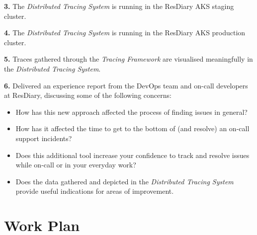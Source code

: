 \documentclass[11pt]{article}
\begin{document}
\textbf{3.} The \textit{Distributed Tracing System} is running in the ResDiary AKS staging cluster.

\textbf{4.} The \textit{Distributed Tracing System} is running in the ResDiary AKS production cluster.

\textbf{5.} Traces gathered through the \textit{Tracing Framework} are visualised meaningfully in the \textit{Distributed Tracing System}.

\textbf{6.} Delivered an experience report from the DevOps team and on-call developers at ResDiary, discussing some of the following concerns:
\begin{itemize}
    \item How has this new approach affected the process of finding issues in general?
    \item How has it affected the time to get to the bottom of (and resolve) an on-call support incidents?
    \item Does this additional tool increase your confidence to track and resolve issues while on-call or in your everyday work?
    \item Does the data gathered and depicted in the \textit{Distributed Tracing System} provide useful indications for areas of improvement.
\end{itemize}

\section{Work Plan}
\label{WorkPlan}

\end{document}

